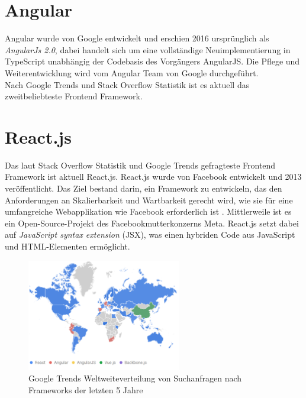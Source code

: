 \section{Angular}
Angular wurde von Google entwickelt und erschien 2016 ursprünglich als \emph{AngularJs 2.0},
dabei handelt sich um eine vollständige Neuimplementierung in TypeScript unabhängig der Codebasis des Vorgängers AngularJS.
Die Pflege und Weiterentwicklung wird vom Angular Team von Google durchgeführt. \cite[S. 209-210]{bin2019}
\\
Nach Google Trends \cite{googleTrends} und Stack Overflow Statistik  \cite{stackoverflowStats} ist es aktuell das zweitbeliebteste
Frontend Framework.

\section{React.js}
Das laut Stack Overflow Statistik \cite{stackoverflowStats} und Google Trends \cite{googleTrends} gefragteste Frontend Framework ist aktuell React.js.
React.js wurde von Facebook entwickelt und 2013 veröffentlicht.
Das Ziel bestand darin, ein Framework zu entwickeln,
das den Anforderungen an Skalierbarkeit und Wartbarkeit gerecht wird,
wie sie für eine umfangreiche Webapplikation wie Facebook erforderlich ist \cite[S. 1]{gackenheimer2015introduction}.
Mittlerweile ist es ein Open-Source-Projekt des Facebookmutterkonzerns Meta.
React.js setzt dabei auf \emph{JavaScript syntax extension} (JSX), was einen hybriden Code aus JavaScript und HTML-Elementen ermöglicht. \cite{react}


\begin{figure}[!htb]
    \centering
    \includegraphics[width=0.6\textwidth]{img/Google Stats/2023-04-26 12_20_26-React, Angular, AngularJS, Vue.js, Backbone.js - Erkunden - Google Trends}
    \caption{Google Trends Weltweiteverteilung von Suchanfragen nach Frameworks der letzten 5 Jahre \cite{googleTrends}}
    \label{fig:google_trends_world}
\end{figure}
